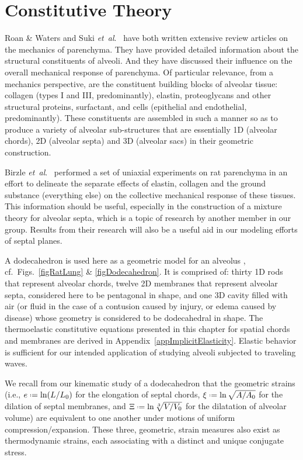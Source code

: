 \part{Constitutive Theory}
\label{partConstitutive}

Roan \& Waters \cite{RoanWaters11} and Suki \textit{et~al}.\ \cite{Sukietal05,Sukietal11} have both written extensive review articles on the mechanics of parenchyma.  They have provided detailed information about the structural constituents of alveoli.  And they have discussed their influence on the overall mechanical response of parenchyma.  Of particular relevance, from a mechanics perspective, are the constituent building blocks of alveolar tissue: collagen (types I and III, predominantly), elastin, proteoglycans and other structural proteins, surfactant, and cells (epithelial and endothelial, predominantly).  These constituents are assembled in such a manner so as to produce a variety of alveolar sub-structures that are essentially 1D (alveolar chords), 2D (alveolar septa) and 3D (alveolar sacs) in their geometric construction.  

Birzle \textit{et~al}.\ \cite{Birzleetal19} performed a set of uniaxial experiments on rat parenchyma in an effort to delineate the separate effects of elastin, collagen and the ground substance (everything else) on the collective mechanical response of these tissues.  This information should be useful, especially in the construction of a mixture theory for alveolar septa, which is a topic of research by another member in our group.  Results from their research will also be a useful aid in our modeling efforts of septal planes.

A dodecahedron is used here as a geometric model for an alveolus \cite{FrankusLee74}, cf.\ Figs.~\ref{figRatLung} \& \ref{figDodecahedron}.  It is comprised of: thirty 1D rods that represent alveolar chords, twelve 2D membranes that represent alveolar septa, considered here to be pentagonal in shape, and one 3D cavity filled with air (or fluid in the case of a contusion caused by injury, or edema caused by disease) whose geometry is considered to be dodecahedral in shape.  The thermo\-elastic constitutive equations presented in this chapter for spatial chords and membranes are derived in Appendix~\ref{appImplicitElasticity}.  Elastic behavior is sufficient for our intended application of studying alveoli subjected to traveling waves.

We recall from our kinematic study of a dodecahedron that the geometric strains (i.e., $e \defeq \ln ( L / L_0 )$ for the elongation of septal chords, $\xi \defeq \ln \sqrt{A / A_0}$ for the dilation of septal membranes, and $\Xi \defeq \ln \sqrt[3]{V / V_0}$ for the dilatation of alveolar volume) are equivalent to one another under motions of uniform compression\slash expansion.  These three, geometric, strain measures also exist as thermo\-dynamic strains, each associating with a distinct and unique conjugate stress. \cite{Freed17,FreedZamani19}

